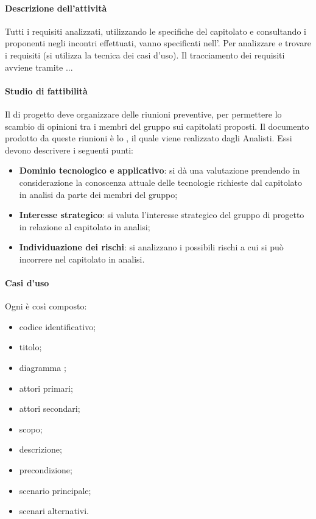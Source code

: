 \paragraph{Descrizione dell'attività}
 Tutti i requisiti analizzati, utilizzando le specifiche del capitolato e consultando i proponenti negli
incontri effettuati, vanno specificati nell’\ARdocRR. Per analizzare e trovare i
requisiti (si utilizza la tecnica dei casi d’uso). Il tracciamento dei requisiti avviene tramite ... 
 \paragraph{Studio di fattibilità}
 Il \RESP{} di progetto deve organizzare delle riunioni preventive, per permettere lo scambio
di opinioni tra i membri del gruppo sui capitolati proposti. Il documento prodotto da queste
riunioni è lo \SFdocRR , il quale viene realizzato dagli Analisti. Essi devono
descrivere i seguenti punti: 
\begin{itemize}
 \item \textbf{Dominio tecnologico e applicativo}: si dà una valutazione prendendo in   considerazione
 la conoscenza attuale delle tecnologie richieste dal capitolato in analisi da parte dei membri  
del gruppo;
 \item \textbf{Interesse strategico}: si valuta l’interesse strategico del gruppo di progetto in relazione
al capitolato in analisi;
 \item \textbf{Individuazione dei rischi}: si analizzano i possibili rischi a cui si può incorrere nel
capitolato in analisi.
\end{itemize}
 \paragraph{Casi d'uso}
 Ogni  è così composto:
 \begin{itemize}
  \item codice identificativo;
  \item titolo;
  \item diagramma ;
  \item attori primari;
  \item attori secondari;
  \item scopo;
  \item descrizione;
  \item precondizione;
  \item scenario principale;
  \item scenari alternativi.
 \end{itemize}
